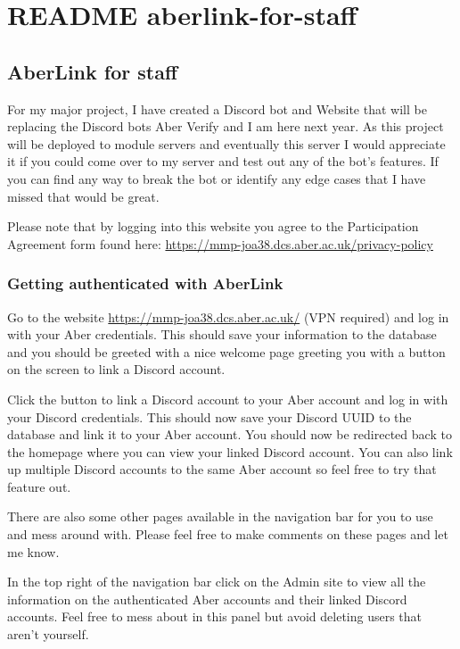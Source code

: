 \chapter{README aberlink-for-staff}{%
\section{AberLink for staff}\label{aberlink-for-staff}}

For my major project, I have created a Discord bot and Website that will
be replacing the Discord bots Aber Verify and I am here next year. As
this project will be deployed to module servers and eventually this
server I would appreciate it if you could come over to my server and
test out any of the bot's features. If you can find any way to break the
bot or identify any edge cases that I have missed that would be great.

Please note that by logging into this website you agree to the
Participation Agreement form found here:
\url{https://mmp-joa38.dcs.aber.ac.uk/privacy-policy}

\hypertarget{getting-authenticated-with-aberlink}{%
\subsection{Getting authenticated with
AberLink}\label{getting-authenticated-with-aberlink}}

Go to the website \url{https://mmp-joa38.dcs.aber.ac.uk/} (VPN required)
and log in with your Aber credentials. This should save your information
to the database and you should be greeted with a nice welcome page
greeting you with a button on the screen to link a Discord account.

Click the button to link a Discord account to your Aber account and log
in with your Discord credentials. This should now save your Discord UUID
to the database and link it to your Aber account. You should now be
redirected back to the homepage where you can view your linked Discord
account. You can also link up multiple Discord accounts to the same Aber
account so feel free to try that feature out.

There are also some other pages available in the navigation bar for you
to use and mess around with. Please feel free to make comments on these
pages and let me know.

In the top right of the navigation bar click on the Admin site to view
all the information on the authenticated Aber accounts and their linked
Discord accounts. Feel free to mess about in this panel but avoid
deleting users that aren't yourself.

